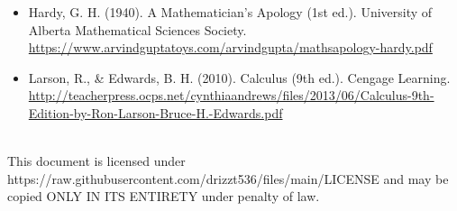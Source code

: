 \documentclass[12pt]{article}
\begin{document}
	\begin{itemize}
		\item Hardy, G. H. (1940). A Mathematician's Apology (1st ed.). University of Alberta Mathematical Sciences Society.\\
			\url{https://www.arvindguptatoys.com/arvindgupta/mathsapology-hardy.pdf}\\

		\item Larson, R., \& Edwards, B. H. (2010). Calculus (9th ed.). Cengage Learning.\\
			\url{http://teacherpress.ocps.net/cynthiaandrews/files/2013/06/Calculus-9th-Edition-by-Ron-Larson-Bruce-H.-Edwards.pdf}
	\end{itemize}
	\vspace{28em}\\
	This document is licensed under https://raw.githubusercontent.com/drizzt536/files/main/LICENSE
	and may be copied ONLY IN ITS ENTIRETY under penalty of law.
\end{document}
